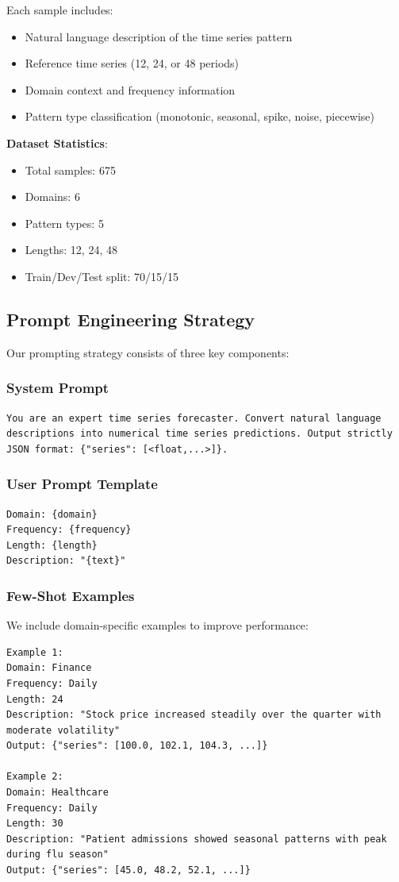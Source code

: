 \documentclass[11pt]{article}
\begin{document}
Each sample includes:
\begin{itemize}
    \item Natural language description of the time series pattern
    \item Reference time series (12, 24, or 48 periods)
    \item Domain context and frequency information
    \item Pattern type classification (monotonic, seasonal, spike, noise, piecewise)
\end{itemize}

\textbf{Dataset Statistics}:
\begin{itemize}
    \item Total samples: 675
    \item Domains: 6
    \item Pattern types: 5
    \item Lengths: 12, 24, 48
    \item Train/Dev/Test split: 70/15/15
\end{itemize}

\subsection{Prompt Engineering Strategy}

Our prompting strategy consists of three key components:

\subsubsection{System Prompt}
\begin{verbatim}
You are an expert time series forecaster. Convert natural language 
descriptions into numerical time series predictions. Output strictly 
JSON format: {"series": [<float,...>]}.
\end{verbatim}

\subsubsection{User Prompt Template}
\begin{verbatim}
Domain: {domain}
Frequency: {frequency}
Length: {length}
Description: "{text}"
\end{verbatim}

\subsubsection{Few-Shot Examples}
We include domain-specific examples to improve performance:
\begin{verbatim}
Example 1:
Domain: Finance
Frequency: Daily
Length: 24
Description: "Stock price increased steadily over the quarter with moderate volatility"
Output: {"series": [100.0, 102.1, 104.3, ...]}

Example 2:
Domain: Healthcare
Frequency: Daily
Length: 30
Description: "Patient admissions showed seasonal patterns with peak during flu season"
Output: {"series": [45.0, 48.2, 52.1, ...]}
\end{verbatim}
\end{document}
